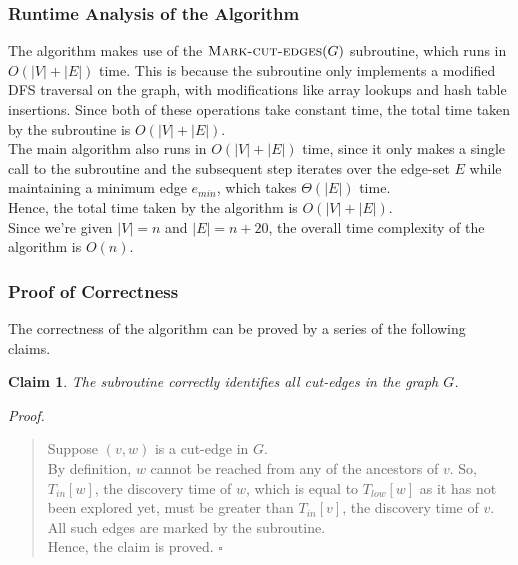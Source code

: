 \documentclass[12pt]{report}
\newtheorem{claim}{Claim}
\begin{document}
    \subsubsection*{Runtime Analysis of the Algorithm}
    The algorithm makes use of the $\Call{Mark-cut-edges}{G}$ subroutine, which runs in $O(|V|+|E|)$ time.
    This is because the subroutine only implements a modified DFS traversal on the graph, with modifications like
    array lookups and hash table insertions. Since both of these operations take constant time, the total time
    taken by the subroutine is $O(|V|+|E|)$.
    \vspace*{10pt} \\
    The main algorithm also runs in $O(|V|+|E|)$ time, since it only makes a single call to the subroutine
    and the subsequent step iterates over the edge-set $E$ while maintaining a minimum edge $e_{min}$, which takes $\Theta(|E|)$ time.
    \vspace*{10pt} \\
    Hence, the total time taken by the algorithm is $O(|V|+|E|)$. \\
    Since we're given $|V| = n$ and $|E| = n + 20$, the overall time complexity of the algorithm is $O(n)$.

    \vfill

    \subsubsection*{Proof of Correctness}
    The correctness of the algorithm can be proved by a series of the following claims.

    \begin{claim}
        The subroutine correctly identifies all cut-edges in the graph $G$.
    \end{claim}
    \textit{Proof.}
    \begin{quote}
        Suppose $(v, w)$ is a cut-edge in $G$. \\
        By definition, $w$ cannot be reached from any of the ancestors of $v$.
        So, $T_{in}[w]$, the discovery time of $w$, which is equal to $T_{low}[w]$ as it has not been explored yet,
        must be greater than $T_{in}[v]$, the discovery time of $v$.
        All such edges are marked by the subroutine. \\
        Hence, the claim is proved. \hfill $\square$
    \end{quote}
\end{document}
